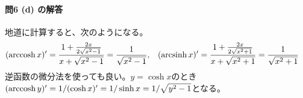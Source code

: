 \paragraph{問6 (d) の解答} 地道に計算すると、次のようになる。
\begin{align*}
(\operatorname{arccosh} x)' &= \frac{1+\frac{2x}{2\sqrt{x^2-1}}}{x+\sqrt{x^2-1}} = \frac{1}{\sqrt{x^2-1}}, &
(\operatorname{arcsinh} x)' &= \frac{1+\frac{2x}{2\sqrt{x^2+1}}}{x+\sqrt{x^2+1}} = \frac{1}{\sqrt{x^2+1}}
\end{align*}
逆函数の微分法を使っても良い。$y=\cosh x$のとき$(\operatorname{arccosh} y)' = 1 / (\cosh x)' = 1 / \sinh x = 1 / \sqrt{y^2-1}$となる。


